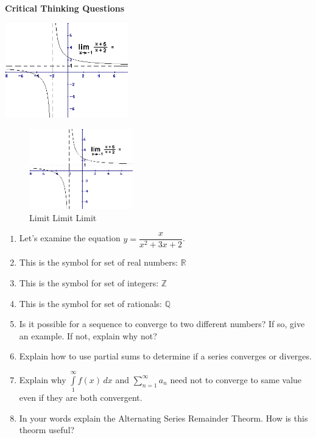 \documentclass[10pt, letterpaper]{article}
\def\eq1{y=\dfrac{x}{x^{2}+3x+2}}
\newcommand{\set}[1]{\setlength\itemsep{#1em}}
\begin{document}
\set{5}

\textbf{Critical Thinking Questions}

\begin{center}
\includegraphics[width=0.4\textwidth]{limit}
\end{center}

\begin{figure}[H] %
\centering %
\includegraphics[width=0.4\textwidth]{limit}
\caption{Limit Limit Limit}
\end{figure}

\begin{enumerate}
\item Let's examine the equation $\eq1$.
\item This is the symbol for set of real numbers: $\mathbb{R}$
\item This is the symbol for set of integers: $\mathbb{Z}$
\item This is the symbol for set of rationals: $\mathbb{Q}$
\item Is it possible for a sequence to converge to two different numbers? If so, give an example. If not, explain why not? 
\item Explain how to use partial sums to determine if a series converges or diverges.
\item Explain why $ \int \limits_{1}^{\infty} f(x) \, dx $ and $ \sum \limits_{n=1}^{\infty} a_n $ need not to converge to same value even if they are both convergent.
\item In your words explain the Alternating Series Remainder Theorm. How is this theorm useful?
\end{enumerate}
\end{document}
